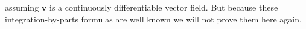\documentclass[../master_thesis.tex]{subfiles}
\begin{document}
assuming $\mathbf{v}$ is a continuously differentiable vector field. But 
because these integration-by-parts formulas are well known we will not prove
them here again.
\end{document}
